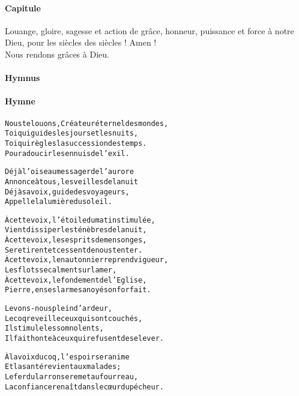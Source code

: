 \documentclass[twoside]{article}
\begin{document}
\begin{paracol}[1]{2}
\switchcolumn

\paragraph{Capitule}
 \capsaut Louange, gloire, sagesse et action de grâce, honneur, puissance et force à notre Dieu, pour les siècles des siècles ! Amen !\\
\rr Nous rendons grâces à Dieu.

\switchcolumn*

\paragraph{Hymnus}


\switchcolumn

\paragraph{Hymne}
\begin{alltt}\normalfont




             
             Nous te louons, Créateur éternel des mondes,
             Toi qui guides les jours et les nuits,
             Toi qui règles la succession des temps.
             Pour adoucir les ennuis de l'exil.
             
             Déjà l'oiseau messager de l'aurore
             Annonce à tous, les veilles de la nuit
             Déjà sa voix, guide des voyageurs,
             Appelle la lumière du soleil.
             
             À cette voix, l'étoile du matin stimulée,
             Vient dissiper les ténèbres de la nuit,
             À cette voix, les esprits de mensonges,
             Se retirent et cessent de nous tenter.
\newpage             
             À cette voix, le nautonnier reprend vigueur,
             Les flots se calment sur la mer,
             À cette voix, le fondement de l'Eglise,
             Pierre, en ses larmes a noyé son forfait.
             
             Levons-nous plein d'ardeur,
             Le coq reveille ceux qui sont couchés,
             Il stimule les somnolents,
             Il fait honte à ceux qui refusent de se lever.
             
             À la voix du coq, l'espoir se ranime
             Et la santé revient aux malades ;
             Le fer du larron se remet au fourreau,
             La confiance renaît dans le cœur du pécheur.
             

\end{alltt}
\end{paracol}
\end{document}
